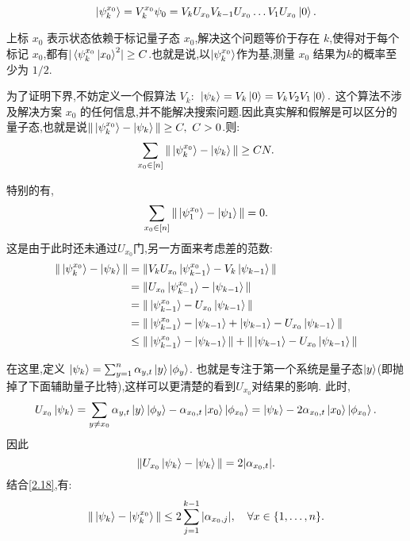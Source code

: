 \begin{equation}
 \ket{\psi_k^{x_0}} = V_k^{x_0}{\psi_0} = V_k U_{x_0} V_{k-1} U_{x_0} \ldots V_1 U_{x_0} \ket{0} .
\end{equation}

上标 $x_0$ 表示状态依赖于标记量子态 $x_0$,解决这个问题等价于存在 $k$,使得对于每个标记 $x_0$,都有$|\bra{\psi_k^{x_0}\ket{x_0}^2}\geq C$.也就是说,以$\ket{\psi_k^{x_0}}$作为基,测量 $x_0$ 结果为$k$的概率至少为 $1/2$.

为了证明下界,不妨定义一个假算法 $V_k$:~$ \ket{\psi_k} = V_k \ket{0} = V_k V_2 V_1 \ket{0}. $
这个算法不涉及解决方案 $x_0$ 的任何信息,并不能解决搜索问题.因此真实解和假解是可以区分的量子态,也就是说$\|\ket{\psi_k^{x_0}}- \ket{\psi_k}\| \geq C ,~ C>0$.则:
\begin{equation}
\sum_{x_0 \in [n]} \|\ket{\psi_k^{x_0}} - \ket{\psi_k}\| \geq CN.
\end{equation}

特别的有,
\begin{equation}\label{2.18.1}
	\sum_{x_0 \in [n]} \|\ket{\psi_1^{x_0}}- \ket{\psi_1}\| =0.
\end{equation}
这是由于此时还未通过$U_{x_0}$门,另一方面来考虑差的范数:
\begin{equation}\label{2.18}
	\begin{aligned}
	\|\ket{\psi_k^{x_0}} - \ket{\psi_k}\| &= \|V_kU_{x_0}\ket{\psi_{k-1}^{x_0}} - V_k\ket{\psi_{k-1}}\| \\
	&= \|U_{x_0}\ket{\psi_{k-1}^{x_0}} - \ket{\psi_{k-1}}\| \\
	&= \|\ket{\psi_{k-1}^{x_0}} - U_{x_0}\ket{\psi_{k-1}}\| \\
	&= \|\ket{\psi_{k-1}^{x_0}} - \ket{\psi_{k-1}} + \ket{\psi_{k-1}} - U_{x_0}\ket{\psi_{k-1}}\| \\
	&\leq \|\ket{\psi_{k-1}^{x_0}} - \ket{\psi_{k-1}}\| + \|\ket{\psi_{k-1}} - U_{x_0}\ket{\psi_{k-1}}\| \\
    \end{aligned}
\end{equation}

在这里,定义 $\ket{\psi_k} = \sum_{y=1}^n \alpha_{y,t} \ket{y} \ket{\phi_y}$. 也就是专注于第一个系统是量子态$\ket{y}$(即抛掉了下面辅助量子比特),这样可以更清楚的看到$U_{x_0}$对结果的影响. 此时,
\begin{equation*}
U_{x_0} \ket{\psi_k} = \sum_{y \neq x_0} \alpha_{y,t} \ket{y} \ket{\phi_y} - \alpha_{x_0,t} \ket{x_0} \ket{\phi_{x_0}} = \ket{\psi_k} - 2 \alpha_{x_0,t} \ket{x_0} \ket{\phi_{x_0}}.
\end{equation*}
因此
\begin{equation*}
\|U_{x_0} \ket{\psi_k} - \ket{\psi_k}\| = 2|\alpha_{x_0,t}|.
\end{equation*} 
结合\cref{2.18},有:
\begin{equation*}
\|\ket{\psi_k} - \ket{\psi_{k}^{x_0}}\| \leq 2 \sum_{j=1}^{k-1} |\alpha_{x_0,j}|, \quad \forall x \in \{1, \ldots, n\}.
\end{equation*}

